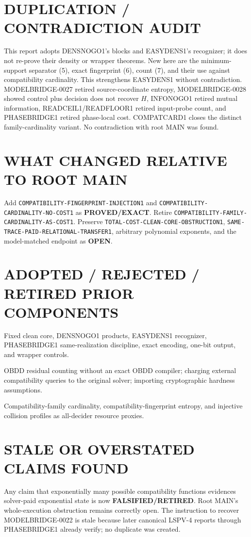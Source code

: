 \documentclass[11pt]{article}
\newcommand{\Status}[1]{\textbf{#1}}
\begin{document}
\section{DUPLICATION / CONTRADICTION AUDIT}
This report adopts DENSNOGO1's blocks and EASYDENS1's recognizer; it does not
re-prove their density or wrapper theorems.  New here are the minimum-support
separator (5), exact fingerprint (6), count (7), and their use against
compatibility cardinality.  This strengthens EASYDENS1 without contradiction.
MODELBRIDGE-0027 retired source-coordinate entropy, MODELBRIDGE-0028 showed
control plus decision does not recover \(H\), INFONOGO1 retired mutual
information, READCEIL1/READFLOOR1 retired input-probe count, and PHASEBRIDGE1
retired phase-local cost.  COMPATCARD1 closes the distinct family-cardinality
variant.  No contradiction with root MAIN was found.

\section{WHAT CHANGED RELATIVE TO ROOT MAIN}
Add \texttt{COMPATIBILITY-FINGERPRINT-INJECTION1} and
\texttt{COMPATIBILITY-CARDINALITY-NO-COST1} as \Status{PROVED/EXACT}.
Retire \texttt{COMPATIBILITY-FAMILY-CARDINALITY-AS-COST1}.  Preserve
\texttt{TOTAL-COST-CLEAN-CORE-OBSTRUCTION1},
\texttt{SAME-TRACE-PAID-RELATIONAL-TRANSFER1}, arbitrary polynomial
exponents, and the model-matched endpoint as \Status{OPEN}.

\section{ADOPTED / REJECTED / RETIRED PRIOR COMPONENTS}
\begin{description}[leftmargin=3.2cm,style=nextline]
\item[ADOPTED] Fixed clean core, DENSNOGO1 products, EASYDENS1 recognizer,
PHASEBRIDGE1 same-realization discipline, exact encoding, one-bit output, and
wrapper controls.
\item[REJECTED] OBDD residual counting without an exact OBDD compiler;
charging external compatibility queries to the original solver; importing
cryptographic hardness assumptions.
\item[RETIRED] Compatibility-family cardinality, compatibility-fingerprint
entropy, and injective collision profiles as all-decider resource proxies.
\end{description}

\section{STALE OR OVERSTATED CLAIMS FOUND}
Any claim that exponentially many possible compatibility functions evidences
solver-paid exponential state is now \Status{FALSIFIED/RETIRED}.  Root MAIN's
whole-execution obstruction remains correctly open.  The instruction to
recover MODELBRIDGE-0022 is stale because later canonical LSPV-4 reports
through PHASEBRIDGE1 already verify; no duplicate was created.
\end{document}
